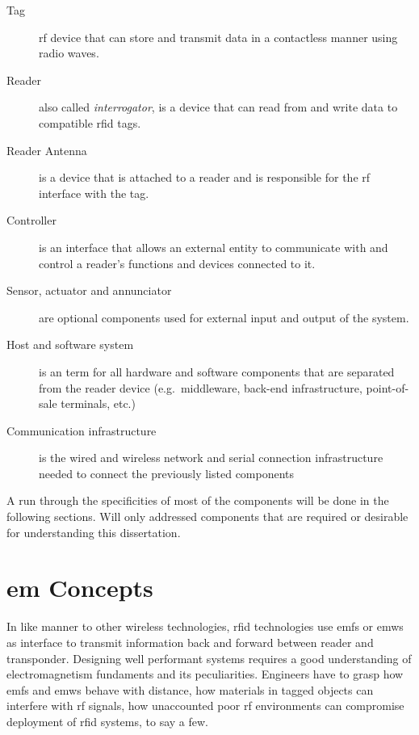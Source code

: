 \begin{description}
    \item[Tag] \ac{rf} device that can store and transmit data in a contactless manner using radio waves.
    \item[Reader] also called \emph{interrogator}, is a device that can read from and write data to compatible \ac{rfid} tags.
    \item[Reader Antenna] is a device that is attached to a reader and is responsible for the \ac{rf} interface with the tag.
    \item[Controller] is an interface that allows an external entity to communicate with and control a reader's functions and devices connected to it.
    \item[Sensor, actuator and annunciator] are optional components used for external input and output of the system.
    \item[Host and software system] is an term for all hardware and software components that are separated from the reader device (e.g.\ middleware, back-end infrastructure, point-of-sale terminals, etc.)
    \item[Communication infrastructure] is the wired and wireless network and serial connection infrastructure needed to connect the previously listed components
\end{description}

A run through the specificities of most of the components will be done in the following sections. Will only addressed components that are required or desirable for understanding this dissertation.

\section{\acl{em} Concepts} \label{sec:em}


In like manner to other wireless technologies, \ac{rfid} technologies use \acp{emf} or \acp{emw} as interface to transmit information back and forward between reader and transponder.
Designing well performant systems requires a good understanding of electromagnetism fundaments and its peculiarities.
Engineers have to grasp how \acp{emf} and \acp{emw} behave with distance, how materials in tagged objects can interfere with \ac{rf} signals, how unaccounted poor \ac{rf} environments can compromise deployment of \ac{rfid} systems, to say a few.

